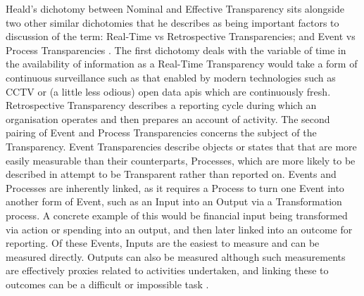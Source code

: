 Heald's dichotomy between Nominal and Effective Transparency sits alongside two other similar dichotomies that he describes as being important factors to discussion of the term: Real-Time vs Retrospective Transparencies; and Event vs Process Transparencies \cite{heald_varieties_2006}. The first dichotomy deals with the variable of time in the availability of information as a Real-Time Transparency would take a form of continuous surveillance such as that enabled by modern technologies such as CCTV or (a little less odious) open data apis which are continuously fresh. Retrospective Transparency describes a reporting cycle during which an organisation operates and then prepares an account of activity. The second pairing of Event and Process Transparencies concerns the subject of the Transparency. Event Transparencies describe objects or states that that are more easily measurable than their counterparts, Processes, which are more likely to be described in attempt to be Transparent rather than reported on. Events and Processes are inherently linked, as it requires a Process to turn one Event into another form of Event, such as an Input into an Output via a Transformation process. A concrete example of this would be financial input being transformed via action or spending into an output, and then later linked into an outcome for reporting. Of these Events, Inputs are the easiest to measure and can be measured directly. Outputs can also be measured although such measurements are effectively proxies related to activities undertaken, and linking these to outcomes can be a difficult or impossible task \cite{heald_varieties_2006}.



